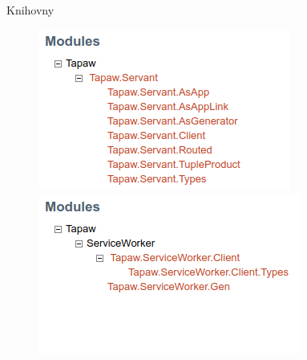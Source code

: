 \documentclass[presentation]{beamer}
\begin{document}
\begin{frame}{Knihovny}
  \begin{figure}
    \centering
    \begin{minipage}{.5\textwidth}
      \centering
      \includegraphics[width=.9\linewidth]{img/screen-route.png}
    \end{minipage}%
    \begin{minipage}{.5\textwidth}
      \centering
      \includegraphics[width=.9\linewidth]{img/screen-serviceworker.png}
    \end{minipage}
  \end{figure}


\end{frame}
\end{document}
